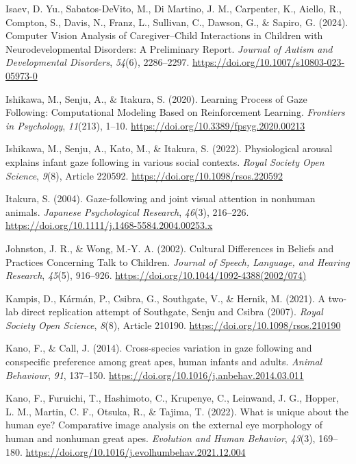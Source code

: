 \documentclass[
]{scrbook}
\newlength{\cslhangindent}
\newenvironment{CSLReferences}[2] %
 {\begin{list}{}{%
  \setlength{\itemindent}{0pt}
  \setlength{\leftmargin}{0pt}
  \setlength{\parsep}{0pt}
  \ifodd #1
   \setlength{\leftmargin}{\cslhangindent}
   \setlength{\itemindent}{-1\cslhangindent}
  \fi
  \setlength{\itemsep}{#2\baselineskip}}}
 {\end{list}}
\begin{document}
\begin{CSLReferences}{1}{0}
Isaev, D. Yu., Sabatos-DeVito, M., Di Martino, J. M., Carpenter, K., Aiello, R., Compton, S., Davis, N., Franz, L., Sullivan, C., Dawson, G., \& Sapiro, G. (2024). Computer {Vision Analysis} of {Caregiver}--{Child Interactions} in {Children} with {Neurodevelopmental Disorders}: {A Preliminary Report}. \emph{Journal of Autism and Developmental Disorders}, \emph{54}(6), 2286--2297. \url{https://doi.org/10.1007/s10803-023-05973-0}

Ishikawa, M., Senju, A., \& Itakura, S. (2020). Learning {Process} of {Gaze Following}: {Computational Modeling Based} on {Reinforcement Learning}. \emph{Frontiers in Psychology}, \emph{11}(213), 1--10. \url{https://doi.org/10.3389/fpsyg.2020.00213}

Ishikawa, M., Senju, A., Kato, M., \& Itakura, S. (2022). Physiological arousal explains infant gaze following in various social contexts. \emph{Royal Society Open Science}, \emph{9}(8), Article 220592. \url{https://doi.org/10.1098/rsos.220592}

Itakura, S. (2004). Gaze-following and joint visual attention in nonhuman animals. \emph{Japanese Psychological Research}, \emph{46}(3), 216--226. \url{https://doi.org/10.1111/j.1468-5584.2004.00253.x}

Johnston, J. R., \& Wong, M.-Y. A. (2002). Cultural {Differences} in {Beliefs} and {Practices Concerning Talk} to {Children}. \emph{Journal of Speech, Language, and Hearing Research}, \emph{45}(5), 916--926. \url{https://doi.org/10.1044/1092-4388(2002/074)}

Kampis, D., Kármán, P., Csibra, G., Southgate, V., \& Hernik, M. (2021). A two-lab direct replication attempt of {Southgate}, {Senju} and {Csibra} (2007). \emph{Royal Society Open Science}, \emph{8}(8), Article 210190. \url{https://doi.org/10.1098/rsos.210190}

Kano, F., \& Call, J. (2014). Cross-species variation in gaze following and conspecific preference among great apes, human infants and adults. \emph{Animal Behaviour}, \emph{91}, 137--150. \url{https://doi.org/10.1016/j.anbehav.2014.03.011}

Kano, F., Furuichi, T., Hashimoto, C., Krupenye, C., Leinwand, J. G., Hopper, L. M., Martin, C. F., Otsuka, R., \& Tajima, T. (2022). What is unique about the human eye? {Comparative} image analysis on the external eye morphology of human and nonhuman great apes. \emph{Evolution and Human Behavior}, \emph{43}(3), 169--180. \url{https://doi.org/10.1016/j.evolhumbehav.2021.12.004}


\end{CSLReferences}
\end{document}

